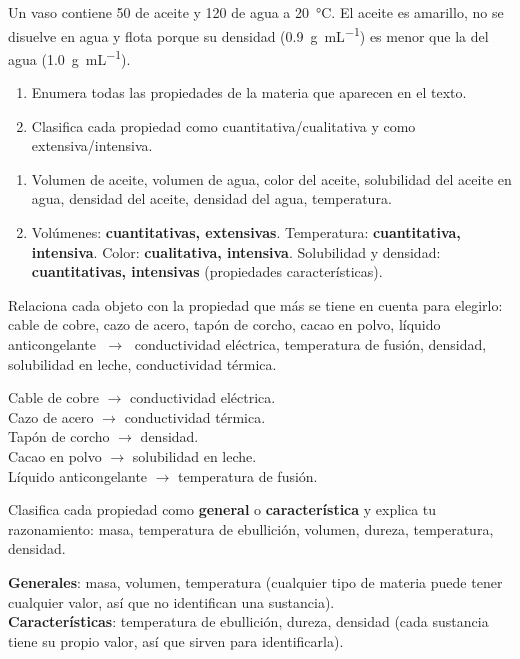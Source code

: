 \begin{exercise}
    Un vaso contiene \qty{50}{\cmcubicos} de aceite y \qty{120}{\cmcubicos} de agua a \qty{20}{\celsius}. El aceite es amarillo, no se disuelve en agua y flota porque su densidad (\qty{0.9}{\g\per\mL}) es menor que la del agua (\qty{1.0}{\g\per\mL}).
    \begin{enumerate}[label=\letraminuscula]
        \item Enumera todas las propiedades de la materia que aparecen en el texto.
        \item Clasifica cada propiedad como cuantitativa/cualitativa y como extensiva/intensiva.
    \end{enumerate}
    \begin{solu}
        \begin{enumerate}[label=\alph*)]
            \item Volumen de aceite, volumen de agua, color del aceite, solubilidad del aceite en agua, densidad del aceite, densidad del agua, temperatura.
            \item Volúmenes: \textbf{cuantitativas, extensivas}. Temperatura: \textbf{cuantitativa, intensiva}. Color: \textbf{cualitativa, intensiva}. Solubilidad y densidad: \textbf{cuantitativas, intensivas} (propiedades características).
        \end{enumerate}
    \end{solu}
\end{exercise}

\begin{exercise}
    Relaciona cada objeto con la propiedad que más se tiene en cuenta para elegirlo: cable de cobre, cazo de acero, tapón de corcho, cacao en polvo, líquido anticongelante \(\;\to\;\) conductividad eléctrica, temperatura de fusión, densidad, solubilidad en leche, conductividad térmica.
    \begin{solu}
        Cable de cobre \(\to\) conductividad eléctrica. \\
        Cazo de acero \(\to\) conductividad térmica. \\
        Tapón de corcho \(\to\) densidad. \\
        Cacao en polvo \(\to\) solubilidad en leche. \\
        Líquido anticongelante \(\to\) temperatura de fusión.
    \end{solu}
\end{exercise}

\begin{exercise}
    Clasifica cada propiedad como \textbf{general} o \textbf{característica} y explica tu razonamiento: masa, temperatura de ebullición, volumen, dureza, temperatura, densidad.
    \begin{solu}
        \textbf{Generales}: masa, volumen, temperatura (cualquier tipo de materia puede tener cualquier valor, así que no identifican una sustancia). \\
        \textbf{Características}: temperatura de ebullición, dureza, densidad (cada sustancia tiene su propio valor, así que sirven para identificarla).
    \end{solu}
\end{exercise}

